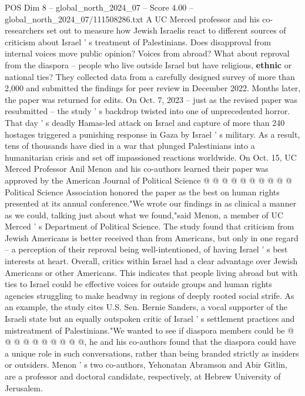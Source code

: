 \begin{textsample}{POS Dim 8 – global\_north\_2024\_07 – Score 4.00 – global\_north\_2024\_07/111508286.txt}  \label{ex:f8_pos_267}
A UC Merced professor and his co-researchers set out to measure how Jewish Israelis react to different sources of criticism about Israel ' s treatment of Palestinians.
Does disapproval from internal voices move public opinion?
Voices from abroad?
What about reproval from the diaspora -- people who live outside Israel but have religious, \textbf{ethnic} or national ties?
They collected data from a carefully designed survey of more than 2,000 and submitted the findings for peer review in December 2022.
Months later, the paper was returned for edits.
On Oct. 7, 2023 -- just as the revised paper was resubmitted -- the study ' s backdrop twisted into one of unprecedented horror.
That day ' s deadly Hamas-led attack on Israel and capture of more than 240 hostages triggered a punishing response in Gaza by Israel ' s military.
As a result, tens of thousands have died in a war that plunged Palestinians into a humanitarian crisis and set off impassioned reactions worldwide.
On Oct. 15, UC Merced Professor Anil Menon and his co-authors learned their paper was approved by the American Journal of Political Science @ @ @ @ @ @ @ @ @ @ Political Science Association honored the paper as the best on human rights presented at its annual conference."We wrote our findings in as clinical a manner as we could, talking just about what we found,"said Menon, a member of UC Merced ' s Department of Political Science.
The study found that criticism from Jewish Americans is better received than from Americans, but only in one regard -- a perception of their reproval being well-intentioned, of having Israel ' s best interests at heart.
Overall, critics within Israel had a clear advantage over Jewish Americans or other Americans.
This indicates that people living abroad but with ties to Israel could be effective voices for outside groups and human rights agencies struggling to make headway in regions of deeply rooted social strife.
As an example, the study cites U.S.
Sen.
Bernie Sanders, a vocal supporter of the Israeli state but an equally outspoken critic of Israel ' s settlement practices and mistreatment of Palestinians."We wanted to see if diaspora members could be @ @ @ @ @ @ @ @ @ @, he and his co-authors found that the diaspora could have a unique role in such conversations, rather than being branded strictly as insiders or outsiders.
Menon ' s two co-authors, Yehonatan Abramson and Abir Gitlin, are a professor and doctoral candidate, respectively, at Hebrew University of Jerusalem.

\end{textsample}
